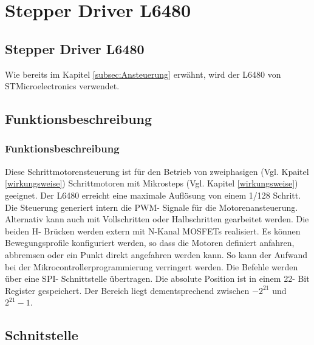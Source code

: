 \ifSTANDALONE
    \section{Stepper Driver L6480} \label{sec:L6480}
\fi
\ifEMBED
    \subsection{Stepper Driver L6480} \label{sec:L6480}
\fi
\ifEMBED
    \BLDCcollab
\fi
Wie bereits im Kapitel \ref*{subsec:Ansteuerung} erwähnt, wird der L6480 von STMicroelectronics verwendet. 

\ifSTANDALONE
    \subsection{Funktionsbeschreibung}
\fi
\ifEMBED
    \subsubsection{Funktionsbeschreibung}
\fi
    Diese Schrittmotorensteuerung ist für den Betrieb von zweiphasigen (Vgl. 
    Kpaitel \ref{wirkungsweise}) Schrittmotoren mit Mikrosteps (Vgl. Kapitel 
    \ref{wirkungsweise}) geeignet. Der L6480 erreicht eine maximale Auflösung 
    von einem 1/128 Schritt. Die Steuerung generiert intern die PWM- Signale 
    für die Motorenansteuerung. Alternativ kann auch mit Vollschritten oder 
    Halbschritten gearbeitet werden. Die beiden H- Brücken werden extern mit 
    N-Kanal MOSFETs realisiert. Es können Bewegungsprofile konfiguriert 
    werden, so dass die Motoren definiert anfahren, abbremsen oder ein Punkt 
    direkt angefahren werden kann. So kann der Aufwand bei der 
    Mikrocontrollerprogrammierung verringert werden. Die Befehle werden über 
    eine SPI- Schnittstelle übertragen. Die absolute Position ist in einem 22- 
    Bit Register gespeichert. Der Bereich liegt dementsprechend zwischen 
    \(-2^{21}\) und \(2^{21}-1\). \cite{Datasheet:L6480} 

\ifSTANDALONE
    \subsection{Schnitstelle}
\fi
\ifEMBED
